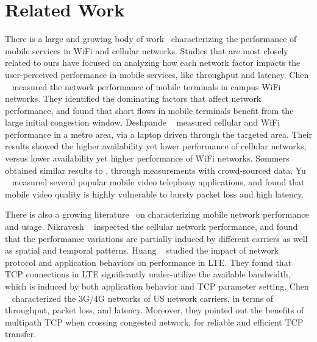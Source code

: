 
\section{Related Work}
\label{sec:related}

There is a large and growing body of work~\cite{chen2012network,deshpande2010performance,sommers2012cell,yu2014can} characterizing the performance of mobile services in WiFi and cellular networks. Studies that are most closely related to ours have focused on analyzing how each network factor impacts the user-perceived performance in mobile services, like throughput and latency. Chen \etal~\cite{chen2012network} measured the network performance of mobile terminals in campus WiFi networks. They identified the dominating factors that affect network performance, and found that short flows in mobile terminals benefit from the large initial congestion window. Deshpande \etal~\cite{deshpande2010performance} measured cellular and WiFi performance in a metro area, via a laptop driven through the targeted area. Their results showed the higher availability yet lower performance of cellular networks, versus lower availability yet higher performance of WiFi networks. Sommers \etal~\cite{sommers2012cell} obtained similar results to \cite{deshpande2010performance}, through measurements with crowd-sourced data. Yu \etal~\cite{yu2014can} measured several popular mobile video telephony applications, and found that mobile video quality is highly vulnerable to bursty packet loss and high latency. 

There is also a growing literature~\cite{nikravesh2014mobile,deng2014wifi,huang2013depth,UM-CS-2012-022} on characterizing mobile network performance and usage. Nikravesh \etal~\cite{nikravesh2014mobile} inspected the cellular network performance, and found that the performance variations are partially induced by different carriers as well as spatial and temporal patterns. Huang \etal~\cite{huang2013depth} studied the impact of network protocol and application behaviors on performance in LTE. They found that TCP connections in LTE significantly under-utilize the available bandwidth, which is induced by both application behavior and TCP parameter setting. Chen \etal~\cite{UM-CS-2012-022} characterized the 3G/4G networks of US network carriers, in terms of throughput, packet loss, and latency. Moreover, they pointed out the benefits of multipath TCP when crossing congested network, for reliable and efficient TCP transfer.

